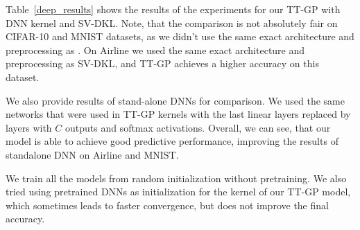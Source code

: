   Table~\ref{deep_results} shows the results of the experiments for our TT-GP
  with DNN kernel and SV-DKL. Note, that the comparison
  is not absolutely fair on CIFAR-10 and MNIST datasets, as we didn't use
  the same exact architecture and preprocessing as \citet{wilson2016stochastic}.
  On Airline we used the same exact architecture and preprocessing as
  SV-DKL, and TT-GP achieves a higher accuracy on this dataset.

  We also provide results of stand-alone DNNs for comparison. We used the
  same networks that were used in TT-GP kernels with the last linear layers replaced
  by layers with $C$ outputs and softmax activations. Overall, we can see, that
  our model is able to achieve good predictive performance,
  improving the results of standalone DNN on Airline and MNIST.

  We train all the models from random initialization without pretraining. We also
  tried using pretrained DNNs as initialization for the kernel of our TT-GP model,
  which sometimes leads to faster convergence, but does not improve the final
  accuracy.
